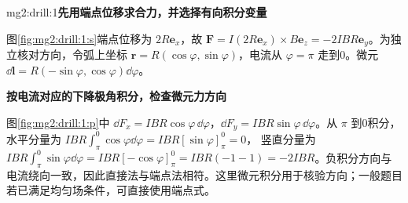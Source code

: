 \LectureAnswerSection

\begin{drillsolution}{mg2:drill:1}\textbf{先用端点位移求合力，并选择有向积分变量}\par\nobreak
图\ref{fig:mg2:drill:1:s}端点位移为 $2R\bm e_x$，故 $\bm F=I(2R\bm e_x)\times B\bm e_z=-2IBR\bm e_y$。为独立核对方向，令弧上坐标 $\bm r=R(\cos\varphi,\sin\varphi)$，电流从 $\varphi=\pi$ 走到0。微元 $\dd\bm l=R(-\sin\varphi,\cos\varphi)\dd\varphi$。



\par\medskip{}\noindent\textbf{按电流对应的下降极角积分，检查微元力方向}\par\nobreak
图\ref{fig:mg2:drill:1:p}中 $\dd F_x=IBR\cos\varphi\,\dd\varphi$，$\dd F_y=IBR\sin\varphi\,\dd\varphi$。从 $\pi$ 到0积分，水平分量为
$IBR\int_\pi^0\cos\varphi\dd\varphi=IBR[\sin\varphi]_\pi^0=0$，
竖直分量为 $IBR\int_\pi^0\sin\varphi\dd\varphi=IBR[-\cos\varphi]_\pi^0=IBR(-1-1)=-2IBR$。负积分方向与电流绕向一致，因此直接法与端点法相符。这里微元积分用于核验方向；一般题目若已满足均匀场条件，可直接使用端点式。\end{drillsolution}
